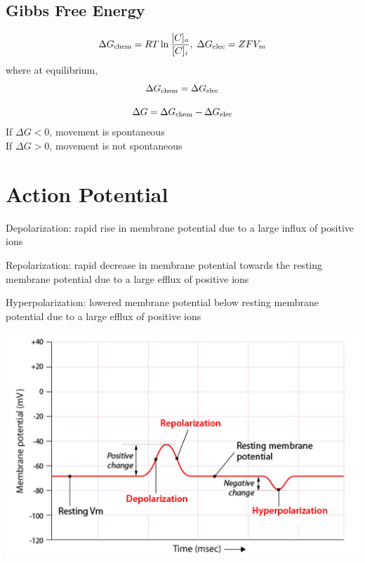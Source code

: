 \documentclass[11pt,fleqn]{book} %
\begin{document}
\subsection{Gibbs Free Energy}
\begin{theorem}
    $$\Delta G_{\rm chem}=RT\ln\frac{[C]_o}{[C]_i},\;\Delta G_{\rm elec}=ZFV_m$$
    where at equilibrium,
    $$\Delta G_{\rm chem}=\Delta G_{\rm elec}$$
\end{theorem}
\begin{proposition}
    $$\Delta G=\Delta G_{\rm chem}-\Delta G_{\rm elec}$$
    If $\Delta G < 0$, movement is spontaneous\\
    If $\Delta G > 0$, movement is not spontaneous
\end{proposition}

\section{Action Potential}
\begin{descriptions}
    \item[Depolarization:] rapid rise in membrane potential due to a large influx of positive ions
    \item[Repolarization:] rapid decrease in membrane potential towards the resting membrane potential due to a large efflux of positive ions
    \item[Hyperpolarization:] lowered membrane potential below resting membrane potential due to a large efflux of positive ions 
\end{descriptions}
\begin{center}
    \includegraphics[width=0.65\linewidth]{Pictures/Screenshot 2024-02-25 223612.png}
\end{center}
\end{document}
